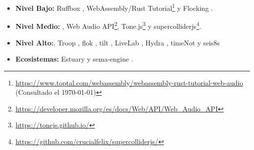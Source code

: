 \begin{itemize}

\item \textbf{Nivel Bajo:} Ruffbox \citep{ruffbox}, WebAssembly/Rust Tutorial\footnote{\url{https://www.toptal.com/webassembly/webassembly-rust-tutorial-web-audio} (Consultado el \today)} y Flocking \citep{flocking}. 
\item \textbf{Nivel Medio:} \citep{supercolliderweb}, Web Audio API\footnote{\url{https://developer.mozilla.org/es/docs/Web/API/Web_Audio_API}}, Tone.js\footnote{\url{https://tonejs.github.io/}} y supercolliderjs\footnote{\url{https://github.com/crucialfelix/supercolliderjs/}}.
\item \textbf{Nivel Alto:}, Troop \citep{Troop}, flok \citep{flok}, tilt \citep{tilt}, LiveLab \citep{livelab}, Hydra \citep{hydra}, timeNot \citep{timenot} y seis8s \citep{seis8s}
\item \textbf{Ecosistemas:} Estuary \citep{estuary} y sema-engine \citep{sema}.
  
\end{itemize}

